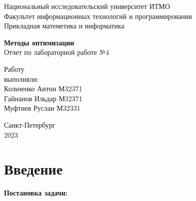 \documentclass[a4paper,14pt,oneside,openany]{memoir}
\title{}
\author{}
\begin{document}
\thispagestyle{empty}

\begin{center}
	
	Национальный исследовательский университет ИТМО\\
	Факультет информационных технологий и программирования\\
	Прикладная матеметика и информатика\\
	
	\vspace{20pt}
	
\end{center}

\vfill

\begin{center}
	\textbf {\fontsize{100}{120}\selectfont Методы оптимизации
	} \\  
	Отчет по лабораторной работе №4
	
\end{center}

\vfill

\begin{flushright}
	
	\hfill {
		Работу \\
		выполняли: \\
		Кольченко Антон М32371 \\ 
		Гайнанов Ильдар М32371 \\ 
		Муфтиев Руслан М32331\\ 
	}
	\vspace{20pt}
	
\end{flushright}

\vfill

\begin{center}
	Санкт-Петербург\\
	2023
\end{center}

\chapter*{Введение}
\textbf{Постановка задачи:}
\end{document}

